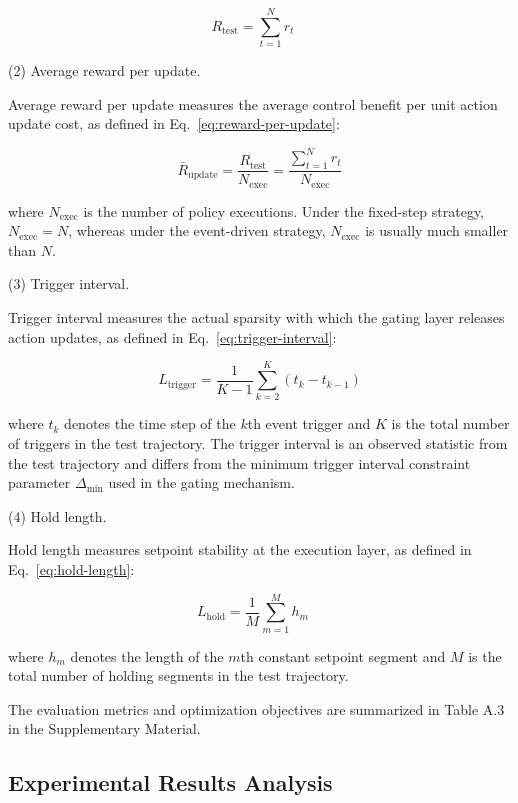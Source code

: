 \documentclass[preprint,12pt]{elsarticle}
\begin{document}
\[
R_{\text{test}} = \sum_{t=1}^{N} r_t \quad \tag{34}\label{eq:cumulative-test-reward}
\]

\par\smallskip
\noindent (2) Average reward per update.
\par\nobreak\noindent Average reward per update measures the average control benefit per unit action update cost, as defined in Eq.~\eqref{eq:reward-per-update}:

\[
\bar{R}_{\text{update}} = \frac{R_{\text{test}}}{N_{\text{exec}}} = \frac{\sum_{t=1}^{N} r_t}{N_{\text{exec}}} \tag{35}\label{eq:reward-per-update}
\]

\noindent where \(N_{\text{exec}}\) is the number of policy executions. Under the fixed-step strategy, \(N_{\text{exec}} = N\), whereas under the event-driven strategy, \(N_{\text{exec}}\) is usually much smaller than \(N\).

\par\smallskip
\noindent (3) Trigger interval.
\par\nobreak\noindent Trigger interval measures the actual sparsity with which the gating layer releases action updates, as defined in Eq.~\eqref{eq:trigger-interval}:

\[
L_{\text{trigger}} = \frac{1}{K-1}\sum_{k=2}^{K}(t_k - t_{k-1}) \tag{36}\label{eq:trigger-interval}
\]

\noindent where \(t_k\) denotes the time step of the \(k\)th event trigger and \(K\) is the total number of triggers in the test trajectory. The trigger interval is an observed statistic from the test trajectory and differs from the minimum trigger interval constraint parameter \(\Delta_{\min}\) used in the gating mechanism.

\par\smallskip
\noindent (4) Hold length.
\par\nobreak\noindent Hold length measures setpoint stability at the execution layer, as defined in Eq.~\eqref{eq:hold-length}:

\[
L_{\text{hold}} = \frac{1}{M}\sum_{m=1}^{M}h_m \quad \tag{37}\label{eq:hold-length}
\]

\noindent where \(h_m\) denotes the length of the \(m\)th constant setpoint segment and \(M\) is the total number of holding segments in the test trajectory.

The evaluation metrics and optimization objectives are summarized in Table A.3 in the Supplementary Material.

\subsection{Experimental Results Analysis}\label{experimental-results-analysis}
\end{document}
